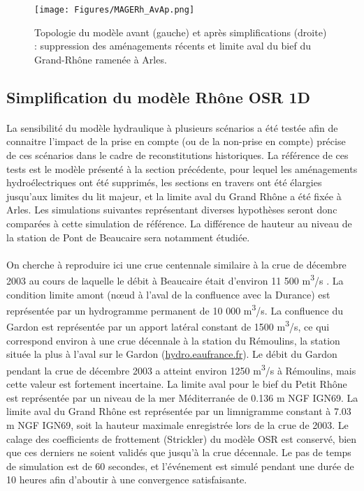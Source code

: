 \documentclass[11pt]{article}
\begin{document}
	\begin{figure}[h]
	\centering
		\texttt{[image: Figures/MAGERh\_AvAp.png]}
        \caption{Topologie du modèle avant (gauche) et après simplifications (droite) : suppression des aménagements récents et limite aval du bief du Grand-Rhône ramenée à Arles.}
		\label{fig:Mageavap}
	\end{figure}		
	
\FloatBarrier	
	\subsection{Simplification du modèle Rhône OSR 1D}
		
	\paragraph{} La sensibilité du modèle hydraulique à plusieurs scénarios a été testée afin de connaitre l'impact de la prise en compte (ou de la non-prise en compte) précise de ces scénarios dans le cadre de reconstitutions historiques. La référence de ces tests est le modèle présenté à la section précédente, pour lequel les aménagements hydroélectriques ont été supprimés, les sections en travers ont été élargies jusqu'aux limites du lit majeur, et la limite aval du Grand Rhône a été fixée à Arles. Les simulations suivantes représentant diverses hypothèses seront donc comparées à cette simulation de référence. La différence de hauteur au niveau de la station de Pont de Beaucaire sera notamment étudiée.
	
	\paragraph{} On cherche à reproduire ici une crue centennale similaire à la crue de décembre 2003 au cours de laquelle le débit à Beaucaire était d'environ 11 500 m\textsuperscript{3}/s \citep{medd_debit_2005}. La condition limite amont (nœud à l'aval de la confluence avec la Durance) est représentée par un hydrogramme permanent de 10 000 m\textsuperscript{3}/s. La confluence du Gardon est représentée par un apport latéral constant de 1500 m\textsuperscript{3}/s, ce qui correspond environ à une crue décennale à la station du Rémoulins, la station située la plus à l'aval sur le Gardon (\url{hydro.eaufrance.fr}). Le débit du Gardon pendant la crue de décembre 2003 a atteint environ 1250 m\textsuperscript{3}/s à Rémoulins, mais cette valeur est fortement incertaine. La limite aval pour le bief du Petit Rhône est représentée par un niveau de la mer Méditerranée de 0.136 m NGF IGN69. La limite aval du Grand Rhône est représentée par un limnigramme constant à 7.03 m NGF IGN69, soit la hauteur maximale enregistrée lors de la crue de 2003. Le calage des coefficients de frottement (Strickler) du modèle OSR \citep{launay_zabr-osr_2017} est conservé, bien que ces derniers ne soient validés que jusqu'à la crue décennale. Le pas de temps de simulation est de 60 secondes, et l'événement est simulé pendant une durée de 10 heures afin d'aboutir à une convergence satisfaisante.
	
\end{document}
